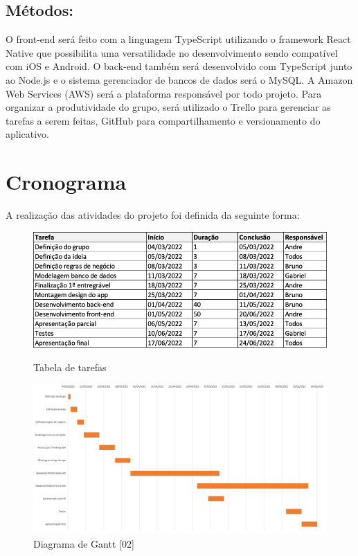 \documentclass[%
  a4paper,%
  12pt,%
  english,%
  brazilian,%
]{article}
\begin{document}
\subsection{Métodos:}%
O front-end será feito com a linguagem TypeScript utilizando o framework React Native que possibilita uma versatilidade no desenvolvimento sendo compatível com iOS e Android.
O back-end também será desenvolvido com TypeScript junto ao Node.js e o sistema gerenciador de bancos de dados será o MySQL. A Amazon Web Services (AWS) será a plataforma responsável por todo projeto.
Para organizar a produtividade do grupo, será utilizado o Trello para gerenciar as tarefas a serem feitas, GitHub para compartilhamento e versionamento do aplicativo. 






\section{Cronograma}%
A realização das atividades do projeto foi definida da seguinte forma:

\begin{figure}[!htb]
\includegraphics[width = 0.95\linewidth]{Figures/excel.png}
\caption{Tabela de tarefas}%
\label{fig:excel}
\includegraphics[width = 0.95\linewidth]{Figures/grafico.png}
\caption{Diagrama de Gantt [02]}%
\label{fig:grafico}
\end{figure}
\end{document}
